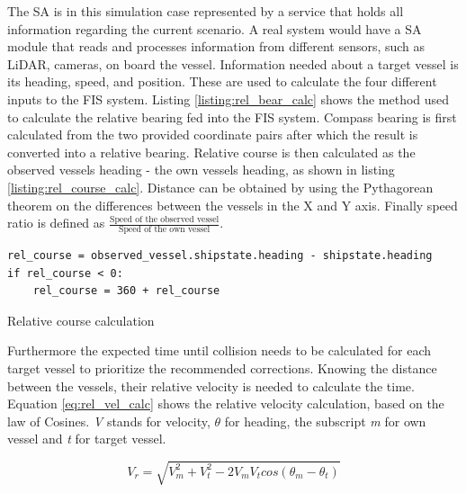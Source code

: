 The SA is in this simulation case represented by a service that holds all information regarding the current scenario. A real system would have a SA module that reads and processes information from different sensors, such as LiDAR, cameras, on board the vessel. Information needed about a target vessel is its heading, speed, and position. These are used to calculate the four different inputs to the FIS system. Listing \ref{listing:rel_bear_calc} shows the method used to calculate the relative bearing fed into the FIS system. Compass bearing is first calculated from the two provided coordinate pairs after which the result is converted into a relative bearing. Relative course is then calculated as the observed vessels heading - the own vessels heading, as shown in listing \ref{listing:rel_course_calc}. Distance can be obtained by using the Pythagorean theorem on the differences between the vessels in the X and Y axis. Finally speed ratio is defined as $\frac{\text{Speed of the observed vessel}}{\text{Speed of the own vessel}}$.
\begin{listing}

    \begin{verbatim}
rel_course = observed_vessel.shipstate.heading - shipstate.heading
if rel_course < 0:
    rel_course = 360 + rel_course
    \end{verbatim}
    \caption{Relative course calculation}
    \label{listing:rel_course_calc}
\end{listing}

Furthermore the expected time until collision needs to be calculated for each target vessel to prioritize the recommended corrections. Knowing the distance between the vessels, their relative velocity is needed to calculate the time. Equation \ref{eq:rel_vel_calc} shows the relative velocity calculation, based on the law of Cosines. \textit{V} stands for velocity, $\theta$ for heading, the subscript \textit{m} for own vessel and \textit{t} for target vessel.

\begin{equation}
    V_r=\sqrt{V_m^2 + V_t^2-2  V_mV_tcos(\theta_m-\theta_t)}
    \label{eq:rel_vel_calc}
\end{equation}




